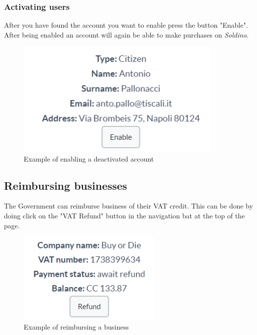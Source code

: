 		\subsubsection{Activating users}
		After you have found the account you want to enable press the button 
		"Enable". After being enabled an account will again be able to make 
		purchases on \textit{Soldino}.
		\begin{figure}[H]
			\includegraphics[width=10cm]{res/images/user_enable.png}
			\centering
			\caption{Example of enabling a deactivated account}
		\end{figure}
	\subsection{Reimbursing businesses}
	The Government can reimburse business of their VAT credit. This can be done 
	by doing click on the "VAT Refund" button in the navigation bat at the top of the page.
	\begin{figure}[H]
		\includegraphics[width=7cm]{res/images/business_refund.png}
		\centering
		\caption{Example of reimbursing a business}
	\end{figure}